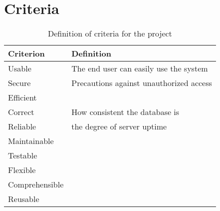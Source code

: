 \section{Criteria}


\begin{table}[htbp]
	\centering
		\begin{tabular}{p{} p{}}
			\hline
			\textbf{Criterion}&\textbf{Definition} \\
			\hline
			Usable&The end user can easily use the system \\
			Secure&Precautions against unauthorized access \\
			Efficient& \\
			Correct&How consistent the database is \\
			Reliable&the degree of server uptime \\
			Maintainable& \\
			Testable& \\
			Flexible& \\
			Comprehensible& \\
			Reusable& \\
			\hline
		\end{tabular}
	\caption{Definition of criteria for the project}
	\label{tab:DefinitionOfCriteria}
\end{table}
